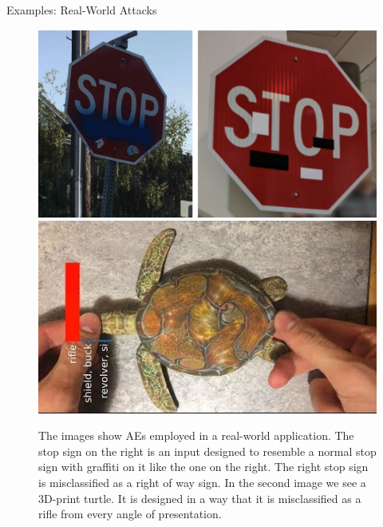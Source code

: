 \documentclass[11pt,compress,t,notes=noshow, xcolor=table]{beamer}
\begin{document}
\begin{vbframe}{Examples: Real-World Attacks}
\begin{figure}[h]
\centering
\includegraphics[width=0.46\linewidth]{figure/AEstop.png}\quad \includegraphics[width=0.45\linewidth]{figure/AEturtle.jpg}
  \caption{The images show AEs employed in a real-world application. The stop sign on the right is an input designed to resemble a normal stop sign with graffiti on it like the one on the right. The right stop sign is misclassified as a right of way sign. In the second image we see a 3D-print turtle. It is designed in a way that it is misclassified as a rifle from every angle of presentation.}
  \label{fig:mnist}
\end{figure} 


\end{vbframe}
\end{document}
